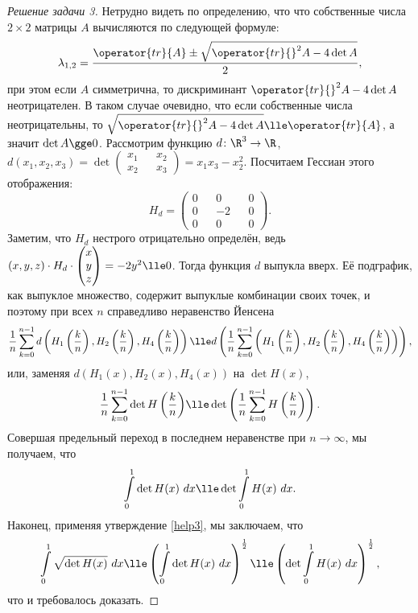 \documentclass[a4paper, 12pt]{article}
\newcommand{\tr}[1]{\operator{tr}{#1}}
\begin{document}
\begin{proof}[Решение задачи 3]
    Нетрудно видеть по определению, что что собственные числа \(2 \times 2\) матрицы \(A\) вычисляются по следующей формуле: \[\lambda_{1,2} = \frac{\tr{A} \pm \sqrt{\tr{}^2 A - 4\det{A}}}{2},\] при этом если \(A\) симметрична, то дискриминант \(\tr{}^2 A - 4 \det{A}\) неотрицателен. В таком случае очевидно, что если собственные числа неотрицательны, то \(\sqrt{\tr{}^2 A - 4\det{A}} \lle \tr{A}\), а значит \(\det{A} \gge 0\). Рассмотрим функцию \(d \colon \R^3 \to \R\), \ \  \(d(x_1, x_2, x_3) = \det \begin{pmatrix}
        x_1 && x_2\\
        x_2 && x_3
    \end{pmatrix} = x_1x_3 - x_2^2\). Посчитаем Гессиан этого отображения: \[H_d = \begin{pmatrix}
        0 && 0 && 0\\
        0 && -2 && 0\\
        0 && 0 && 0
    \end{pmatrix}.\] Заметим, что \(H_d\) нестрого отрицательно определён, ведь \((x, y, z) \cdot H_d \cdot \begin{pmatrix}
        x\\
        y\\
        z
    \end{pmatrix} = -2y^2 \lle 0\). Тогда функция \(d\) выпукла вверх. Её подграфик, как выпуклое множество, содержит выпуклые комбинации своих точек, и поэтому при всех \(n\) справедливо неравенство Йенсена \[\frac{1}{n} \sum\limits_{k=0}^{n-1} d\left(H_1\left(\frac{k}{n}\right), H_2\left(\frac{k}{n}\right), H_4\left(\frac{k}{n}\right)\right) \lle d\left(\frac{1}{n} \sum\limits_{k=0}^{n-1} \left(H_1\left(\frac{k}{n}\right), H_2\left(\frac{k}{n}\right), H_4\left(\frac{k}{n}\right)\right)\right),\] или, заменяя \(d(H_1(x), H_2(x), H_4(x))\) на \(\det{H(x)}\), \[\frac{1}{n} \sum\limits_{k = 0}^{n-1} \det{H\left(\frac{k}{n}\right)} \lle \det\left(\frac{1}{n} \sum\limits_{k = 0}^{n-1} H\left(\frac{k}{n}\right)\right).\] Совершая предельный переход в последнем неравенстве при \(n \to \infty\), мы получаем, что \[\int\limits_0^1 \det{H(x)} \ dx \lle \det\int\limits_0^1 H(x) \ dx.\] Наконец, применяя утверждение \ref{help3}, мы заключаем, что \[\int\limits_0^1 \sqrt{\det{H(x)}}\ dx \lle \left(\int\limits_0^1 \det{H(x)} \ dx\right)^\frac{1}{2} \lle \left(\det\int\limits_0^1 H(x) \ dx\right)^\frac{1}{2},\] что и требовалось доказать.
\end{proof}
\end{document}
